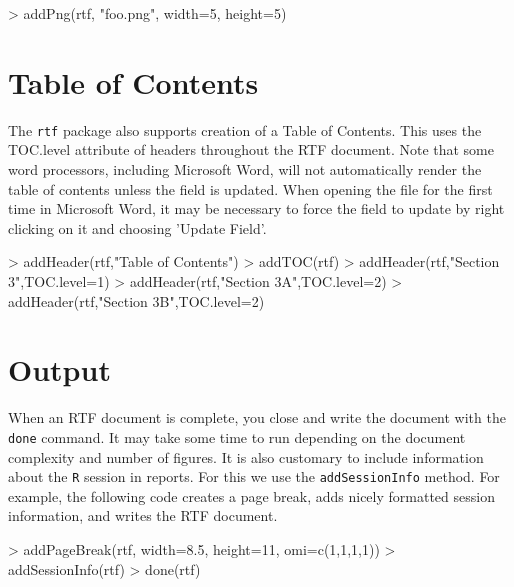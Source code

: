 \documentclass[11pt,letterpaper]{article}
\begin{document}
\begin{Schunk}
\begin{Sinput}
> addPng(rtf, "foo.png", width=5, height=5)
\end{Sinput}
\end{Schunk}


\section{Table of Contents}
The \texttt{rtf} package also supports creation of a Table of Contents.  This uses the TOC.level attribute of headers throughout the RTF document.  Note that some word processors, including Microsoft Word, will not automatically render the table of contents unless the field is updated.  When opening the file for the first time in Microsoft Word, it may be necessary to force the field to update by right clicking on it and choosing 'Update Field'.

\begin{Schunk}
\begin{Sinput}
> addHeader(rtf,"Table of Contents")
> addTOC(rtf)
> addHeader(rtf,"Section 3",TOC.level=1)
> addHeader(rtf,"Section 3A",TOC.level=2)
> addHeader(rtf,"Section 3B",TOC.level=2)
\end{Sinput}
\end{Schunk}


\section{Output}
When an RTF document is complete, you close and write the document with the \texttt{done} command.  It may take some time to run depending on the document complexity and number of figures.  It is also customary to include information about the \texttt{R} session in reports.  For this we use the \texttt{addSessionInfo} method.  For example, the following code creates a page break, adds nicely formatted session information, and writes the RTF document.

\begin{Schunk}
\begin{Sinput}
> addPageBreak(rtf, width=8.5, height=11, omi=c(1,1,1,1))
> addSessionInfo(rtf)
> done(rtf)
\end{Sinput}
\end{Schunk}
\end{document}
